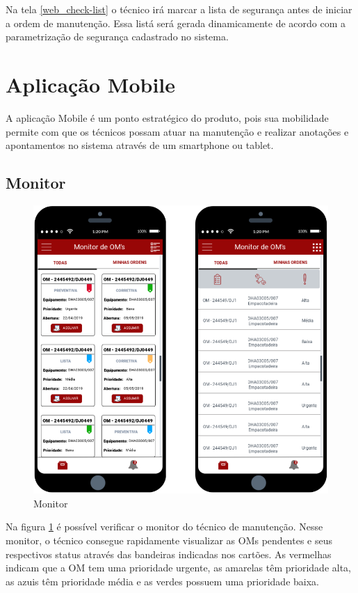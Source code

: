Na tela \ref{web_check-list} o técnico irá marcar a lista de segurança antes de iniciar a ordem de manutenção. Essa listá será gerada dinamicamente de acordo com a parametrização de segurança cadastrado no sistema.

\section{Aplicação Mobile}
A aplicação Mobile é um ponto estratégico do produto, pois sua mobilidade permite com que os técnicos possam atuar na manutenção e realizar anotações e apontamentos no sistema através de um smartphone ou tablet.

\subsection{Monitor}

\begin{figure}[H]
	\caption{\label{mobile_monitor}Monitor}
	\begin{center}
		\includegraphics[scale=0.75]{./Figuras/mobile/monitor.png}
	\end{center}
\end{figure}

Na figura \ref{mobile_monitor} é possível verificar o monitor do técnico de manutenção. Nesse monitor, o técnico consegue rapidamente visualizar as OMs pendentes e seus respectivos status através das bandeiras indicadas nos cartões. As  vermelhas indicam que a OM tem uma prioridade urgente, as amarelas têm prioridade alta, as azuis têm prioridade média e as verdes possuem uma prioridade baixa.

